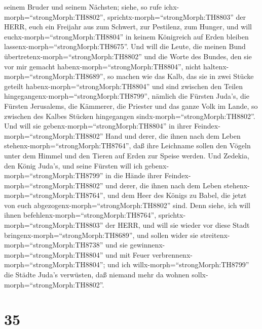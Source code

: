 seinem Bruder und seinem Nächsten; siehe, so rufe
ichx-morph=``strongMorph:TH8802'', sprichtx-morph=``strongMorph:TH8803''
der HERR, euch ein Freijahr aus zum Schwert, zur Pestilenz, zum Hunger,
und will euchx-morph=``strongMorph:TH8804'' in keinem Königreich auf
Erden bleiben lassenx-morph=``strongMorph:TH8675''.  Und
will die Leute, die meinen Bund übertretenx-morph=``strongMorph:TH8802''
und die Worte des Bundes, den sie vor mir gemacht
habenx-morph=``strongMorph:TH8804'', nicht
haltenx-morph=``strongMorph:TH8689'', so machen wie das Kalb, das sie in
zwei Stücke geteilt habenx-morph=``strongMorph:TH8804'' und sind
zwischen den Teilen hingegangenx-morph=``strongMorph:TH8799'',
 nämlich die Fürsten Juda's, die Fürsten Jerusalems, die
Kämmerer, die Priester und das ganze Volk im Lande, so zwischen des
Kalbes Stücken hingegangen sindx-morph=``strongMorph:TH8802''.
 Und will sie gebenx-morph=``strongMorph:TH8804'' in ihrer
Feindex-morph=``strongMorph:TH8802'' Hand und derer, die ihnen nach dem
Leben stehenx-morph=``strongMorph:TH8764'', daß ihre Leichname sollen
den Vögeln unter dem Himmel und den Tieren auf Erden zur Speise werden.
 Und Zedekia, den König Juda's, und seine Fürsten will ich
gebenx-morph=``strongMorph:TH8799'' in die Hände ihrer
Feindex-morph=``strongMorph:TH8802'' und derer, die ihnen nach dem Leben
stehenx-morph=``strongMorph:TH8764'', und dem Heer des Königs zu Babel,
die jetzt von euch abgezogenx-morph=``strongMorph:TH8802'' sind.
 Denn siehe, ich will ihnen
befehlenx-morph=``strongMorph:TH8764'',
sprichtx-morph=``strongMorph:TH8803'' der HERR, und will sie wieder vor
diese Stadt bringenx-morph=``strongMorph:TH8689'', und sollen wider sie
streitenx-morph=``strongMorph:TH8738'' und sie
gewinnenx-morph=``strongMorph:TH8804'' und mit Feuer
verbrennenx-morph=``strongMorph:TH8804''; und ich
willx-morph=``strongMorph:TH8799'' die Städte Juda's verwüsten, daß
niemand mehr da wohnen sollx-morph=``strongMorph:TH8802''.

\hypertarget{section-34}{%
\section{35}\label{section-34}}

